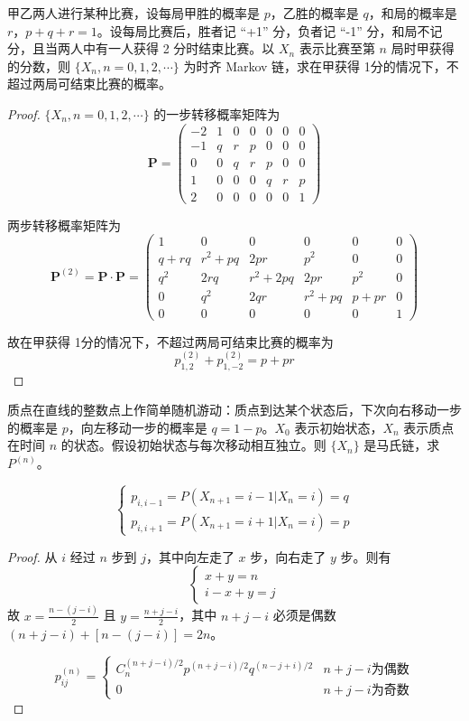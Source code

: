 \documentclass[lang=cn,10pt,thmcnt=section]{elegantbook}
\begin{document}
\begin{example}
	甲乙两人进行某种比赛，设每局甲胜的概率是 $p$，乙胜的概率是 $q$，和局的概率是 $r$，$p + q + r = 1$。设每局比赛后，胜者记 “+1” 分，负者记 “-1” 分，和局不记分，且当两人中有一人获得 2 分时结束比赛。以 $X_n$ 表示比赛至第 $n$ 局时甲获得的分数，则 $\{X_n, n = 0, 1,2,\cdots\}$ 为时齐 Markov 链，求在甲获得 1分的情况下，不超过两局可结束比赛的概率。


\end{example}
\begin{proof}
	$\{X_n, n = 0, 1, 2,\cdots\}$ 的一步转移概率矩阵为
\[
\mathbf{P} = 
\begin{pmatrix}
-2 & 1 & 0 & 0 & 0 & 0 & 0 \\
-1 & q & r & p & 0 & 0 & 0 \\
0 & 0 & q & r & p & 0 & 0 \\
1 & 0 & 0 & 0 & q & r & p \\
2 & 0 & 0 & 0 & 0 & 0 & 1
\end{pmatrix}
\]

两步转移概率矩阵为
\[
\mathbf{P}^{(2)} = \mathbf{P} \cdot \mathbf{P} = 
\begin{pmatrix}
1 & 0 & 0 & 0 & 0 & 0 \\
q + rq & r^2 + pq & 2pr & p^2 & 0 & 0 \\
q^2 & 2rq & r^2 + 2pq & 2pr & p^2 & 0 \\
0 & q^2 & 2qr & r^2 + pq & p + pr & 0 \\
0 & 0 & 0 & 0 & 0 & 1
\end{pmatrix}
\]

故在甲获得 1分的情况下，不超过两局可结束比赛的概率为
\[
p_{1,2}^{(2)} + p_{1,-2}^{(2)} = p + pr
\]
\end{proof}

\begin{example}
	质点在直线的整数点上作简单随机游动：质点到达某个状态后，下次向右移动一步的概率是 $p$，向左移动一步的概率是 $q = 1 - p$。$X_0$ 表示初始状态，$X_n$ 表示质点在时间 $n$ 的状态。假设初始状态与每次移动相互独立。则 $\{X_n\}$ 是马氏链，求 $P^{(n)}$。

\[
\begin{cases}
p_{i, i-1} = P(X_{n+1} = i - 1 | X_n = i) = q \\
p_{i, i+1} = P(X_{n+1} = i + 1 | X_n = i) = p
\end{cases}
\]


\end{example}
\begin{proof}
从 $i$ 经过 $n$ 步到 $j$，其中向左走了 $x$ 步，向右走了 $y$ 步。则有
\[
\begin{cases}
x + y = n \\
i - x + y = j
\end{cases}
\]
故 $x = \frac{n - (j - i)}{2}$ 且 $y = \frac{n + j - i}{2}$，其中 $n + j - i$ 必须是偶数 $(n + j - i) + [n - (j - i)] = 2n$。

\[
p_{ij}^{(n)} = 
\begin{cases} 
C_n^{(n+j-i)/2} p^{(n+j-i)/2} q^{(n-j+i)/2} & n + j - i \text{为偶数} \\
0 & n + j - i \text{为奇数}
\end{cases}
\]
\end{proof}
\end{document}
